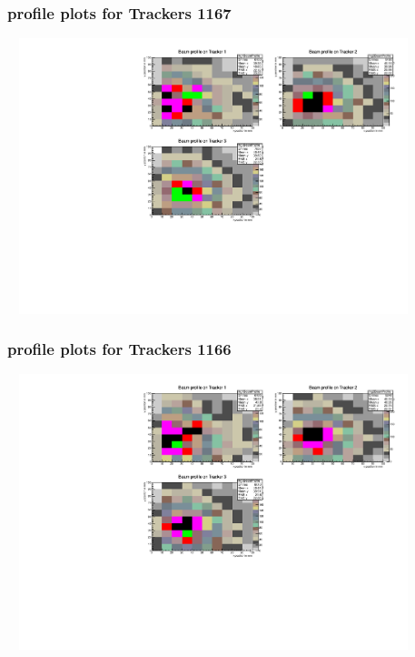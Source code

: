 \documentclass[slidestop,compress,mathserif]{beamer}
\begin{document}
\begin{frame}\frametitle{profile plots for Trackers 1167}
	 \includegraphics[width=12cm,height=8cm]{profile_plots_for_Trackers_1167.pdf}
\end{frame}
\begin{frame}\frametitle{profile plots for Trackers 1166}
	 \includegraphics[width=12cm,height=8cm]{profile_plots_for_Trackers_1166.pdf}
\end{frame}
\end{document}
